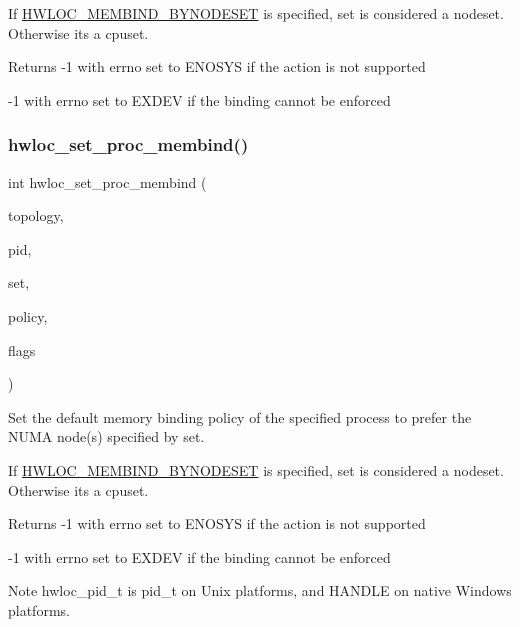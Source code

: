 If \hyperlink{a00191_ggab00475fd98815bf4fb9aaf752030e7d2a71f19fe4505f1c083dc8e6f7bdea6256}{H\+W\+L\+O\+C\+\_\+\+M\+E\+M\+B\+I\+N\+D\+\_\+\+B\+Y\+N\+O\+D\+E\+S\+ET} is specified, set is considered a nodeset. Otherwise it\textquotesingle{}s a cpuset.

\begin{DoxyReturn}{Returns}
-\/1 with errno set to E\+N\+O\+S\+YS if the action is not supported 

-\/1 with errno set to E\+X\+D\+EV if the binding cannot be enforced 
\end{DoxyReturn}
\mbox{\label{a00191_gabc91ff16f7e41047924e3a4ae6d9da7e}} 
\subsubsection{\texorpdfstring{hwloc\+\_\+set\+\_\+proc\+\_\+membind()}{hwloc\_set\_proc\_membind()}}
{\footnotesize\ttfamily int hwloc\+\_\+set\+\_\+proc\+\_\+membind (\begin{DoxyParamCaption}\item[{\hyperlink{a00186_ga9d1e76ee15a7dee158b786c30b6a6e38}{hwloc\+\_\+topology\+\_\+t}}]{topology,  }\item[{hwloc\+\_\+pid\+\_\+t}]{pid,  }\item[{\hyperlink{a00205_gae991a108af01d408be2776c5b2c467b2}{hwloc\+\_\+const\+\_\+bitmap\+\_\+t}}]{set,  }\item[{\hyperlink{a00191_gac9764f79505775d06407b40f5e4661e8}{hwloc\+\_\+membind\+\_\+policy\+\_\+t}}]{policy,  }\item[{int}]{flags }\end{DoxyParamCaption})}



Set the default memory binding policy of the specified process to prefer the N\+U\+MA node(s) specified by {\ttfamily set}. 

If \hyperlink{a00191_ggab00475fd98815bf4fb9aaf752030e7d2a71f19fe4505f1c083dc8e6f7bdea6256}{H\+W\+L\+O\+C\+\_\+\+M\+E\+M\+B\+I\+N\+D\+\_\+\+B\+Y\+N\+O\+D\+E\+S\+ET} is specified, set is considered a nodeset. Otherwise it\textquotesingle{}s a cpuset.

\begin{DoxyReturn}{Returns}
-\/1 with errno set to E\+N\+O\+S\+YS if the action is not supported 

-\/1 with errno set to E\+X\+D\+EV if the binding cannot be enforced
\end{DoxyReturn}
\begin{DoxyNote}{Note}
{\ttfamily hwloc\+\_\+pid\+\_\+t} is {\ttfamily pid\+\_\+t} on Unix platforms, and {\ttfamily H\+A\+N\+D\+LE} on native Windows platforms. 
\end{DoxyNote}

